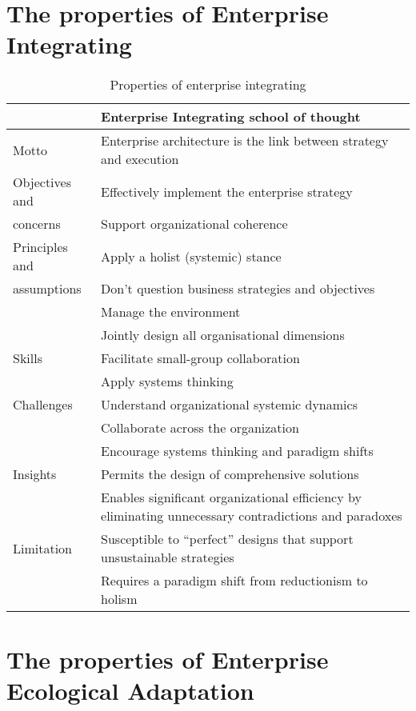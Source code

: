 \section{The properties of Enterprise Integrating}
\begin{small}
\begin{longtable}{p{}p{}}
	\toprule
	& \textbf{Enterprise Integrating school of thought} \\ \midrule%
	\endhead%
	\hline
	\caption{Properties of enterprise integrating \parencite[p. 39]{Lapalme2012}}
	\label{tab:interpriseintegrating}	
	\endfoot%
	Motto    		& Enterprise architecture is the link between strategy and execution \\
	Objectives and 	& Effectively implement the enterprise strategy \\
	concerns		& Support organizational coherence \\
	Principles and  & Apply a holist (systemic) stance \\
	assumptions		& Don’t question business strategies and objectives  \\
					& Manage the environment \\
					& Jointly design all organisational dimensions \\
	Skills 			& Facilitate small-group collaboration \\
					& Apply systems thinking \\
	Challenges		& Understand organizational systemic dynamics \\
					& Collaborate across the organization \\
					& Encourage systems thinking and paradigm shifts \\
	Insights		& Permits the design of comprehensive solutions \\
					& Enables significant organizational efficiency by eliminating unnecessary contradictions and paradoxes \\
	Limitation		& Susceptible to “perfect” designs that support unsustainable strategies \\
					& Requires a paradigm shift from reductionism to holism \\
	\bottomrule
\end{longtable}
\end{small}
\newpage
\section{The properties of Enterprise Ecological Adaptation}
\label{appsec:eea}

